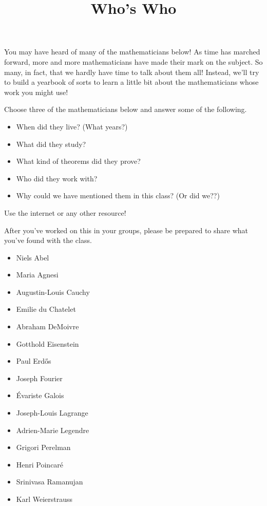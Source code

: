 \documentclass[handout,nooutcomes]{ximera}
\title{Who's Who}
\begin{document}
\begin{abstract}
    
\end{abstract}
\maketitle

You may have heard of many of the mathematicians below!  As time has marched forward, 
more and more mathematicians have made their mark on the subject.  So many, in fact, 
that we hardly have time to talk about them all!  Instead, we'll try to build a yearbook 
of sorts to learn a little bit about the mathematicians whose work you might use!

Choose three of the mathematicians below and answer some of the following.
\begin{itemize}
\item When did they live? (What years?)
\item What did they study?
\item What kind of theorems did they prove?
\item Who did they work with?
\item Why could we have mentioned them in this class? (Or did we??)
\end{itemize}
Use the internet or any other resource!

After you've worked on this in your groups, please be prepared to share what you've found 
with the class.

\begin{itemize}
    \item Niels Abel
    \item Maria Agnesi
    \item Augustin-Louis Cauchy
    \item Emilie du Chatelet
    \item Abraham DeMoivre
    \item Gotthold Eisenstein
    \item Paul Erd\H{o}s
    \item Joseph Fourier
    \item \'{E}variste Galois
    \item Joseph-Louis Lagrange
    \item Adrien-Marie Legendre
    \item Grigori Perelman
    \item Henri Poincar\'{e}
    \item Srinivasa Ramanujan
    \item Karl Weierstrauss
\end{itemize}
\end{document}
